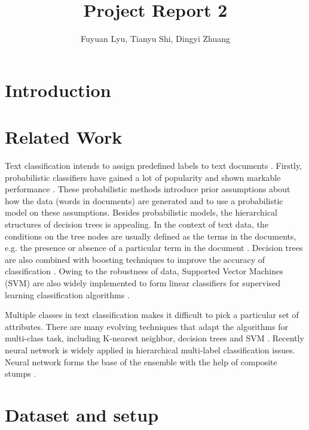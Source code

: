 \documentclass[11pt]{scrartcl}
\title{Project Report 2}
\author{Fuyuan Lyu, Tianyu Shi, Dingyi Zhuang}
\begin{document}
\maketitle

\begin{abstract}

\end{abstract}

\section{Introduction}

\section{Related Work}
Text classification intends to assign predefined labels to text documents \cite{allahyari2017brief,thangaraj2018text}. Firstly, probabilistic classifiers have gained a lot of popularity and shown markable performance \cite{chakrabarti1997using,joachims1996probabilistic,koller1997hierarchically,larkey1996combining}. These probabilistic methods introduce prior assumptions about how the data (words in documents) are generated and to use a probabilistic model on these assumptions. Besides probabilistic models, the hierarchical structures of decision trees is appealing. In the context of text data, the conditions on the tree nodes are usually defined as the terms in the documents, e.g. the presence or absence of a particular term in the document \cite{breiman1984classification,duda2012pattern}. Decision trees are also combined with boosting techniques to improve the accuracy of classification \cite{freund1995desicion,schapire2000boostexter}. Owing to the robustness of data, Supported Vector Machines (SVM) are also widely implemented to form linear classifiers for supervised learning classification algorithms \cite{joachims1998text,joachims2001statistical}.

Multiple classes in text classification makes it difficult to pick a particular set of attributes. There are many evolving techniques that adapt the algorithms for multi-class task, including K-nearest neighbor, decision trees and SVM \cite{tang2016multi,yi2011multi}. Recently neural network is widely applied in hierarchical multi-label classification issues. Neural network forms the base of the ensemble with the help of composite stumps \cite{nie2015neural,cerri2014hierarchical}.
\section{Dataset and setup}
\end{document}
